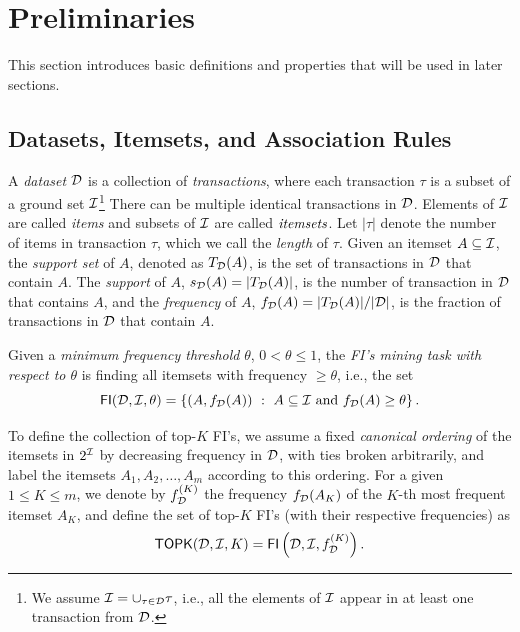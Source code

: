 \section{Preliminaries}\label{sec:vcmineprelim}

This section introduces basic definitions and properties that will be used in later sections.

\subsection{Datasets, Itemsets, and Association Rules}\label{sec:vcminepreldm}
A
\emph{dataset} ${\cal D}$ is a collection of \emph{transactions}, where each
transaction $\tau$ is a subset of a ground set ${\cal I}$\footnote{We assume
${\cal I}=\cup_{\tau\in{\cal D}} \tau$, i.e., all the elements of ${\cal I}$ appear in at
least one transaction from ${\cal D}$.} There can be multiple
identical transactions in ${\cal D}$. Elements of ${\cal I}$ are called \emph{items} and
subsets of ${\cal I}$ are called $\emph{itemsets}$. Let $|\tau|$ denote the number
of items in transaction $\tau$, which we call the \emph{length} of $\tau$. Given
an itemset $A\subseteq{\cal I}$, the \emph{support set} of $A$, denoted as
$T_{\cal D}(A)$, is the set of transactions in ${\cal D}$ that contain $A$. The
\emph{support} of $A$, $s_{\cal D}(A) =|T_{\cal D}(A)|$, is the number of transaction
in ${\cal D}$ that contains $A$, and the \emph{frequency} of $A$, $f_{\cal D}(A)=
|T_{\cal D}(A)|/|{\cal D}|$, is the fraction of transactions in ${\cal D}$ that contain
$A$.
\begin{definition}\label{def:vcmineminethreshold}
  Given a \emph{minimum frequency
  threshold} $\theta$, $0<\theta\le 1$, the \emph{FI's mining task with respect
  to $\theta$} is finding all itemsets with frequency $\geq\theta$, i.e., the
  set 
  \[ \mathsf{FI}({\cal D},{\cal I},\theta)=\left\{(A,f_{\cal D}(A)) ~:~ A \subseteq{\cal I} \mbox{ and }
  f_{{\cal D}}(A)\ge \theta\right\}.  \]
\end{definition}
  To define the collection of top-$K$ FI's, we assume a fixed \textit{canonical
  ordering} of the itemsets in $2^{\cal I}$ by decreasing frequency in ${\cal D}$, with
  ties broken arbitrarily, and label the itemsets $A_1,A_2,\dotsc,A_m$ according
  to this ordering.  For a given $1 \leq K \leq m$, we denote by
  $f^{(K)}_{\cal D}$ the frequency $f_{\cal D}(A_K)$ of the $K$-th most frequent itemset
  $A_K$, and define the set of top-$K$ FI's  (with their respective frequencies)
  as \[
  \mathsf{TOPK}({\cal D},{\cal I},K)= \mathsf{FI}\left({\cal D},{\cal I},f^{(K)}_{\cal D}\right).  \]

